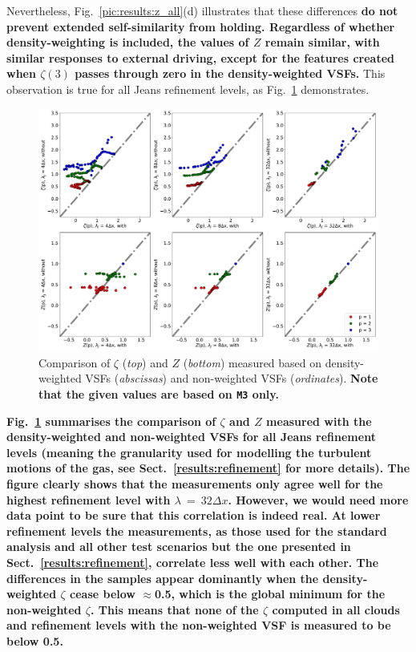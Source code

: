 Nevertheless, Fig.~\ref{pic:results:z_all}(d) illustrates that these differences \textbf{do not prevent extended self-similarity from holding. 
Regardless of whether density-weighting is included, the values of $Z$ remain similar, with similar responses to external driving, except for the features created when $\zeta(3)$ passes through zero in the density-weighted VSFs.}
This observation is true for all Jeans refinement levels, as Fig.~\ref{pic:results:comp_weighting} demonstrates.


\begin{figure}
	\centering
    \includegraphics[width=\textwidth]{comp_weighting.pdf}
    \caption{ Comparison of $\zeta$ (\textit{top}) and $Z$ (\textit{bottom}) measured based on density-weighted VSFs (\textit{abscissas}) and non-weighted VSFs (\textit{ordinates}). \textbf{Note that the given values are based on \texttt{M3} only.}}
    \label{pic:results:comp_weighting}
\end{figure}

\textbf{Fig.~\ref{pic:results:comp_weighting} summarises the comparison of $\zeta$ and $Z$ measured with the density-weighted and non-weighted VSFs for all Jeans refinement levels (meaning the granularity used for modelling the turbulent motions of the gas, see Sect.~\ref{results:refinement} for more details).
The figure clearly shows that the measurements only agree well for the highest refinement level with $\lambda~=~32\Delta x$.
However, we would need more data point to be sure that this correlation is indeed real.
At lower refinement levels the measurements, as those used for the standard analysis and all other test scenarios but the one presented in Sect.~\ref{results:refinement}, correlate less well with each other. 
The differences in the samples appear dominantly when the density-weighted $\zeta$ cease below $\approx$0.5, which is the global minimum for the non-weighted $\zeta$. 
This means that none of the $\zeta$ computed in all clouds and refinement levels with the non-weighted VSF is measured to be below 0.5. }

